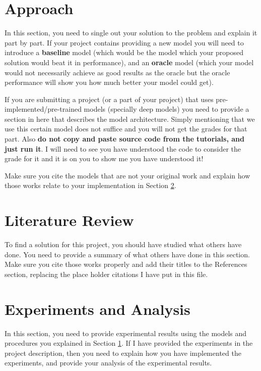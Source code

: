 \documentclass{article}
\begin{document}
\section{Approach}\label{sec:approach}
In this section, you need to single out your solution to the problem and explain it part by part.
If your project contains providing a new model you will need to introduce a \textbf{baseline} model (which would be the model which your proposed solution would beat it in performance), and an \textbf{oracle} model (which your model would not necessarily achieve as good results as the oracle but the oracle performance will show you how much better your model could get).

If you are submitting a project (or a part of your project) that uses pre-implemented/pre-trained models (specially deep models) you need to provide a section in here that describes the model architecture. Simply mentioning that we use this certain model does not suffice and you will not get the grades for that part. Also \textbf{do not copy and paste source code from the tutorials, and just run it}. I will need to see you have understood the code to consider the grade for it and it is on you to show me you have understood it!

Make sure you cite the models that are not your original work and explain how those works relate to your implementation in Section \ref{sec:lit_rev}.

\section{Literature Review}\label{sec:lit_rev}
To find a solution for this project, you should have studied what others have done. You need to provide a summary of what others have done in this section. Make sure you cite those works properly and add their titles to the References section, replacing the place holder citations I have put in this file.


\section{Experiments and Analysis}\label{sec:exp_and_analysis}
In this section, you need to provide experimental results using the models and procedures you explained in Section \ref{sec:approach}. If I have provided the experiments in the project description, then you need to explain how you have implemented the experiments, and provide your analysis of the experimental results.
\end{document}
